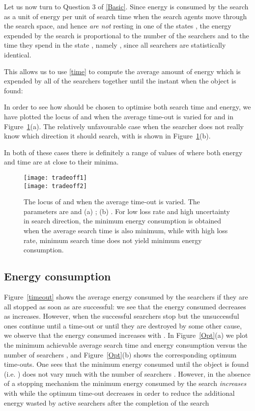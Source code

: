 \documentclass[journal]{IEEEtran}
\begin{document}
Let us now turn to Question 3 of \ref{Basic}. Since energy is consumed by the search as a unit of energy per unit of search time when the
search agents move through the search space, and hence {\em are not} resting in one of the states , the energy expended by the search is proportional to
the number of the searchers  and to the time they spend in the state , namely
, since all searchers are statistically identical.

This allows us to use \eqref{time} to compute the average amount of energy which is expended by all of the  searchers together until the instant when the object is found:



In order to see how  should be chosen to optimise both search time and energy, we have plotted the locus of  and  when the average time-out  is varied for  and  in Figure~\ref{fig-tradeoff}(a). The relatively unfavourable case when the searcher does not really know which direction it should search,
with   is shown in Figure~\ref{fig-tradeoff}(b).

In both of these cases there is definitely a range of values
of  where both energy and time are at  close to their minima.


\begin{figure}[]\centering
\texttt{[image: tradeoff1]} \\\vspace{0.2in}
\texttt{[image: tradeoff2]}
\caption{The locus of  and  when the average time-out  is varied. The parameters are  and (a) ; (b) . For low loss rate and high uncertainty in search direction, the minimum energy consumption is obtained when the average search time is also minimum, while with high loss rate, minimum search time does not yield minimum energy consumption.}\label{fig-tradeoff}
\end{figure}

\subsection{Energy consumption}\label{energy}



Figure~\ref{timeout} shows the average energy consumed by the  searchers if they are all stopped as soon as  are successful: we see that the energy consumed decreases as  increases. However, when the successful searchers stop but the unsuccessful ones continue until a time-out or until they are destroyed by some other cause, we observe that the energy consumed increases with . In Figure~\ref{Opt}(a) we plot the minimum achievable average search time and energy consumption versus the number of searchers , and Figure~\ref{Opt}(b) shows the corresponding optimum time-outs. One sees that the minimum energy consumed until the object is found (i.e. ) does not vary much with the number of searchers . However, in the absence of a stopping mechanism the minimum energy consumed by the search  {\em increases} with  while the optimum time-out decreases in order to reduce the additional energy wasted by active searchers after the completion of the search
\end{document}
